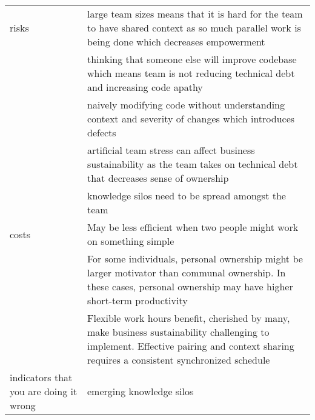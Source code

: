\documentclass{sig-alternate-05-2015}
\begin{document}
\begin{table*}[t]
\begin{tabular}{p{1.1in}p{5.0in}}
\hline
risks              & large team sizes means that it is hard for the team to have shared context as so much parallel work is being done which decreases empowerment                                                  \\ 
                   & thinking that someone else will improve codebase which means team is not reducing technical debt and increasing code apathy                                                                    \\ 
                   & naively modifying code without understanding context and severity of changes which introduces defects                                                                                          \\ 
                   & artificial team stress can affect business sustainability as the team takes on technical debt that decreases sense of ownership                                                                \\ 
                   & knowledge silos need to be spread amongst the team                                                                                                                                             \\ 
\hline
costs              & May be less efficient when two people might work on something simple                                                                                                                           \\ 
                   & For some individuals, personal ownership might be larger motivator than communal ownership. In these cases, personal ownership may have higher short-term productivity                         \\ 
                   & Flexible work hours benefit, cherished by many, make business sustainability challenging to implement. Effective pairing and context sharing requires a consistent synchronized schedule       \\ 
\hline
indicators that you are doing it wrong   & emerging knowledge silos \\                                                                                                                                                                                                                                   
\hline
\end{tabular}
\end{table*}









%
%

\end{document}
